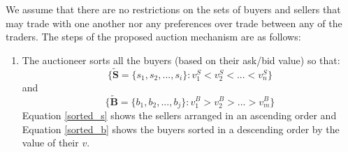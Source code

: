 We assume that there are no restrictions on the sets of buyers and sellers that may trade with one another nor any preferences over trade between any of the traders. The steps of the proposed auction mechanism are as follows:
\begin{enumerate}
\item The auctioneer sorts all the buyers (based on their ask/bid value) so that:
\begin{equation}
\{\tilde{\mathbf{S}} = \{s_{1}, s_{2}, ...,s_{i}\} : v^S_{1}<v^S_{2}<...<v^S_{n}\}
\label{sorted_s}
\end{equation}
and
\begin{equation}
\{\tilde{\mathbf{B}} = \{b_{1}, b_{2}, ...,b_{j}\} : v^B_{1}>v^B_{2}>...>v^B_{m}\}
\label{sorted_b}
\end{equation}
Equation \ref{sorted_s} shows the sellers arranged in an ascending order and Equation \ref{sorted_b} shows the buyers sorted in a descending order by the value of their $v$.


\end{enumerate}
